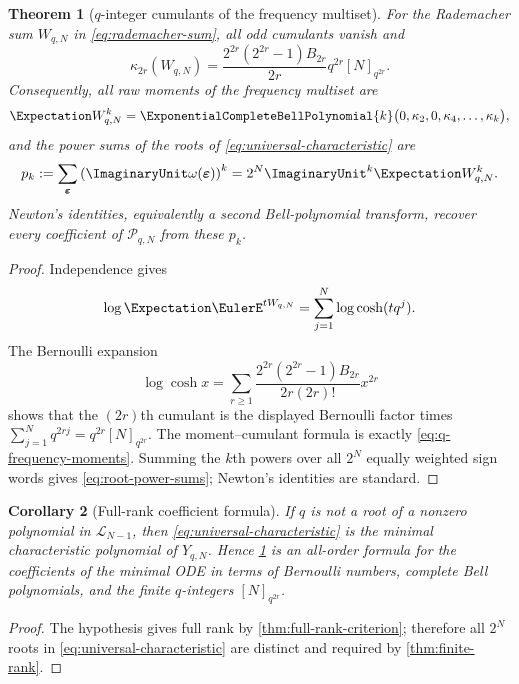 \documentclass[11pt]{article}
\numberwithin{equation}{section}
\newtheorem{theorem}{Theorem}[section]
\newtheorem{corollary}[theorem]{Corollary}
\theoremstyle{definition}
\theoremstyle{remark}
\newcommand{\eps}{\varepsilon}
\begin{document}
\begin{theorem}[$q$-integer cumulants of the frequency multiset]
\label{thm:q-cumulants}
For the Rademacher sum $W_{q,N}$ in \eqref{eq:rademacher-sum}, all odd
cumulants vanish and
\begin{equation}
 \boxed{
 \kappa_{2r}(W_{q,N})=
 \frac{2^{2r}(2^{2r}-1)B_{2r}}{2r}
 q^{2r}[N]_{q^{2r}}.}
 \label{eq:q-cumulants}
\end{equation}
Consequently, all raw moments of the frequency multiset are
\begin{equation}
 \Expectation W_{q,N}^k=
 \ExponentialCompleteBellPolynomial{k}\bigl(0,\kappa_2,0,\kappa_4,\ldots,\kappa_k\bigr),
 \label{eq:q-frequency-moments}
\end{equation}
and the power sums of the roots of \eqref{eq:universal-characteristic} are
\begin{equation}
 p_k:=\sum_{\bm\eps}
 \left(\ImaginaryUnit\omega(\bm\eps)\right)^k
 =2^N\ImaginaryUnit^k\Expectation W_{q,N}^k.
 \label{eq:root-power-sums}
\end{equation}
Newton's identities, equivalently a second Bell-polynomial transform, recover
every coefficient of $\mathscr P_{q,N}$ from these $p_k$.
\end{theorem}
\begin{proof}
Independence gives
\begin{equation}
 \log\Expectation\EulerE^{tW_{q,N}}=
 \sum_{j=1}^{N}\log\cosh(tq^j).
 \label{eq:logcosh-sum}
\end{equation}
The Bernoulli expansion
\begin{equation}
 \log\cosh x=
 \sum_{r\ge1}
 \frac{2^{2r}(2^{2r}-1)B_{2r}}{2r(2r)!}x^{2r}
 \label{eq:logcosh-Bernoulli}
\end{equation}
shows that the $(2r)$th cumulant is the displayed Bernoulli factor times
$\sum_{j=1}^{N}q^{2rj}=q^{2r}[N]_{q^{2r}}$.  The moment--cumulant formula is
exactly \eqref{eq:q-frequency-moments}.  Summing the $k$th powers over all
$2^N$ equally weighted sign words gives \eqref{eq:root-power-sums}; Newton's
identities are standard.
\end{proof}

\begin{corollary}[Full-rank coefficient formula]
\label{cor:full-rank-q-coeff}
If $q$ is not a root of a nonzero polynomial in $\mathscr L_{N-1}$, then
\eqref{eq:universal-characteristic} is the minimal characteristic polynomial
of $Y_{q,N}$.  Hence \cref{thm:q-cumulants} is an all-order formula for the
coefficients of the minimal ODE in terms of Bernoulli numbers, complete Bell
polynomials, and the finite $q$-integers $[N]_{q^{2r}}$.
\end{corollary}
\begin{proof}
The hypothesis gives full rank by \cref{thm:full-rank-criterion}; therefore all
$2^N$ roots in \eqref{eq:universal-characteristic} are distinct and required
by \cref{thm:finite-rank}.
\end{proof}
\end{document}
